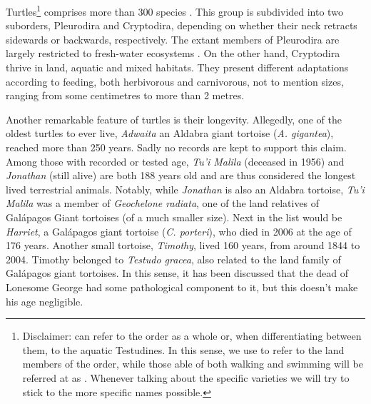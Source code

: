 Turtles\footnote{Disclaimer:  can refer to the order as a whole or, when differentiating between them, to the aquatic Testudines. In this sense, we use  to refer to the land members of the order, while those able of both walking and swimming will be referred at as . Whenever talking about the specific varieties we will try to stick to the more specific names possible.} comprises more than 300 species \cite{Rhodin2017}.
This group is subdivided into two suborders, Pleurodira and Cryptodira, depending on whether their neck retracts sidewards or backwards, respectively.
The extant members of Pleurodira are largely restricted to fresh-water ecosystems \cite{Ferreira2018}. 
On the other hand, Cryptodira thrive in land, aquatic and mixed habitats.
They present different adaptations according to feeding, both herbivorous and carnivorous, not to mention sizes, ranging from some centimetres to more than 2 metres.

Another remarkable feature of turtles is their longevity.
Allegedly, one of the oldest turtles to ever live, \textsl{Adwaita} an Aldabra giant tortoise (\textit{A. gigantea}), reached more than 250 years.
Sadly no records are kept to support this claim.
Among those with recorded or tested age, \textsl{Tu'i Malila} (deceased in 1956) and \textsl{Jonathan} (still alive) are both 188 years old and are thus considered the longest lived terrestrial animals.
Notably, while \textsl{Jonathan} is also an Aldabra tortoise, \textsl{Tu'i Malila} was a member of \textit{Geochelone radiata}, one of the land relatives of Gal\'{a}pagos Giant tortoises (of a much smaller size).
Next in the list would be \textsl{Harriet}, a Gal\'{a}pagos giant tortoise (\textit{C. porteri}), who died in 2006 at the age of 176 years.
Another small tortoise, \textsl{Timothy}, lived 160 years, from around 1844 to 2004.
Timothy belonged to \textit{Testudo gracea}, also related to the land family of Gal\'{a}pagos giant tortoises.
In this sense, it has been discussed that the  dead of Lonesome George had some pathological component to it, but this doesn't make his age negligible.


